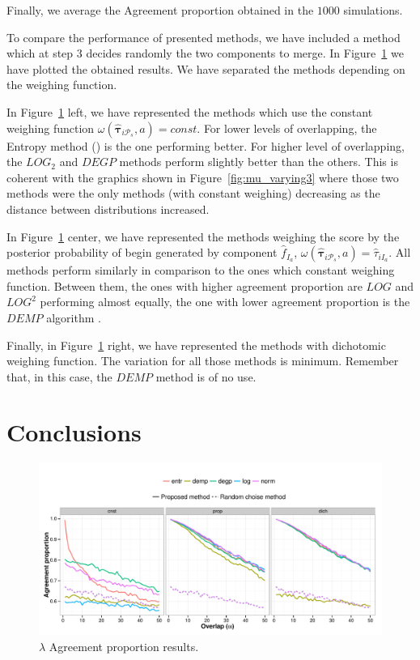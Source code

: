 \documentclass[10pt, a4paper]{article}
\newcommand{\m}[1]{\boldsymbol{#1}}
\begin{document}
\begin{spacing}{1.9}
Finally, we average the Agreement proportion obtained in the $1000$ simulations.

To compare the performance of presented methods, we have included a method which at step $3$ decides randomly the two components to merge. In Figure~\ref{fig:mub} we have plotted the obtained results. We have separated the methods depending on the weighing function.

In Figure~\ref{fig:mub} left, we have represented the methods which use the constant weighing function $\omega(\hat{\m \tau}_{i \mathcal{P}_s}, a) = const$. For lower levels of overlapping, the Entropy method (\cite{baudry2010combining}) is the one performing better. For higher level of overlapping, the $LOG_2$ and $DEGP$ methods perform slightly better than the others. This is coherent with the graphics shown in Figure~\ref{fig:mu_varying3} where those two methods were the only methods (with constant weighing) decreasing as the distance between distributions increased.

In Figure~\ref{fig:mub} center, we have represented the methods weighing the score by the posterior probability of begin generated by component $\hat{f}_{I_a}$, $\omega(\hat{\m \tau}_{i \mathcal{P}_s}, a) =  \hat{\tau}_{iI_a}$. All methods perform similarly in comparison to the ones which constant weighing function. Between them, the ones with higher agreement proportion are $LOG$ and $LOG^2$ performing almost equally, the one with lower agreement proportion is the $DEMP$ algorithm \citep{hennig2010methods}.

Finally, in Figure~\ref{fig:mub} right, we have represented the methods with dichotomic weighing function. The variation for all those methods is minimum. Remember that, in this case, the $DEMP$ method is of no use.

\section{Conclusions}
\label{conclusions}

\begin{figure}[!h]
\centering
\includegraphics[width=\textwidth]{linesagreement.pdf}
\caption{$\lambda$ Agreement proportion results.}
\label{fig:mub}
\end{figure}



\end{spacing}
\end{document}

